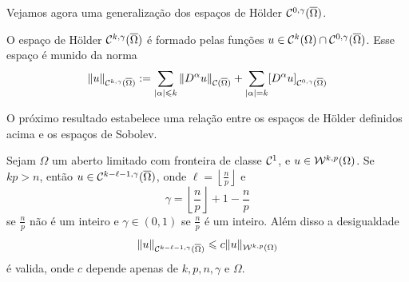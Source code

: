 Vejamos agora uma generalização dos espaços de Hölder $\mathcal{C}^{0,\gamma}(\overline \Omega)$.

\begin{dbox}
    O espaço de Hölder $\mathcal{C}^{k,\gamma}(\overline\Omega)$ é formado pelas funções $u \in \mathcal{C}^k(\Omega) \cap \mathcal{C}^{0,\gamma}(\overline\Omega)$. Esse espaço é munido da norma
    \[
        \Vert u \Vert_{\mathcal{C}^{k,\gamma}(\overline\Omega)} := \sum_{|\alpha| \leqslant k} \Vert D^{\alpha}u \Vert_{\mathcal{C}(\overline\Omega)} + \sum_{|\alpha| = k} [D^\alpha u]_{\mathcal{C}^{0,\gamma}(\overline\Omega)}
    \] 
\end{dbox}

O próximo resultado estabelece uma relação entre os espaços de Hölder definidos acima e os espaços de Sobolev.

\begin{tbox} \label{thm:geral2}
    Sejam $\Omega$ um aberto limitado com fronteira de classe $\mathcal{C}^1$, e $u \in \mathcal{W}^{k,p}(\Omega)$. 
    Se $kp > n$, então $u \in \mathcal{C}^{k - \ell - 1,\gamma}(\overline\Omega)$, onde $\ell = \left\lfloor \frac{n}{p} \right\rfloor$ e
    \[
        \gamma = \left\lfloor \frac{n}{p} \right\rfloor + 1 - \frac{n}{p}
    \]
    se $\frac{n}{p}$ não é um inteiro e $\gamma \in (0,1)$ se $\frac{n}{p}$ é um inteiro.
    Além disso a desigualdade
    \begin{equation} \label{eq:geral2}
        \Vert u \Vert_{\mathcal{C}^{k - \ell - 1,\gamma}(\overline\Omega)} \leqslant c \Vert u \Vert_{\mathcal{W}^{k,p}(\Omega)}
    \end{equation}
    é valida, onde $c$ depende apenas de $k, p, n, \gamma$ e $\Omega$.
\end{tbox}
